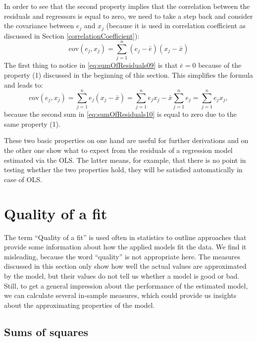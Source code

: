 \documentclass[
]{book}
\theoremstyle{definition}
\theoremstyle{definition}
\theoremstyle{definition}
\theoremstyle{definition}
\theoremstyle{remark}
\begin{document}
In order to see that the second property implies that the correlation between the residuals and regressors is equal to zero, we need to take a step back and consider the covariance between \(e_j\) and \(x_j\) (because it is used in correlation coefficient as discussed in Section \ref{correlationCoefficient}):
\begin{equation}
    \mathrm{cov}(e_j,x_j) = \sum_{j=1}^n (e_j - \bar{e})(x_j - \bar{x})
    \label{eq:sumOfResiduals09}
\end{equation}
The first thing to notice in \eqref{eq:sumOfResiduals09} is that \(\bar{e}=0\) because of the property (1) discussed in the beginning of this section. This simplifies the formula and leads to:
\begin{equation}
    \mathrm{cov}(e_j,x_j) = \sum_{j=1}^n e_j (x_j - \bar{x}) = \sum_{j=1}^n e_j x_j - \bar{x} \sum_{j=1}^n e_j = \sum_{j=1}^n e_j x_j ,
    \label{eq:sumOfResiduals10}
\end{equation}
because the second sum in \eqref{eq:sumOfResiduals10} is equal to zero due to the same property (1).

These two basic properties on one hand are useful for further derivations and on the other one show what to expect from the residuals of a regression model estimated via the OLS. The latter means, for example, that there is no point in testing whether the two properties hold, they will be satisfied automatically in case of OLS.

\section{Quality of a fit}\label{linearRegressionSimpleQualityOfFit}

The term ``Quality of a fit'' is used often in statistics to outline approaches that provide some information about how the applied models fit the data. We find it misleading, because the word ``quality'' is not appropriate here. The measures discussed in this section only show how well the actual values are approximated by the model, but their values do not tell us whether a model is good or bad. Still, to get a general impression about the performance of the estimated model, we can calculate several in-sample measures, which could provide us insights about the approximating properties of the model.

\subsection{Sums of squares}\label{sums-of-squares}
\end{document}

